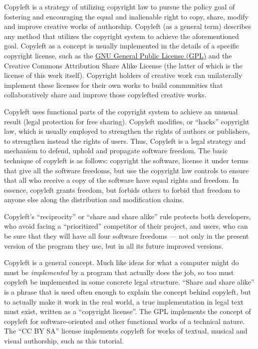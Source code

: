 \label{copyleft-definition}

Copyleft is a strategy of utilizing copyright law to pursue the policy goal
of fostering and encouraging the equal and inalienable right to copy, share,
modify and improve creative works of authorship.  Copyleft (as a general
term) describes any method that utilizes the copyright system to achieve the
aforementioned goal.  Copyleft as a concept is usually implemented in the
details of a specific copyright license, such as the
\hyperref[GPLv3-full-text]{GNU General Public License (GPL)} and the Creative
Commons Attribution Share Alike License (the latter of which is the license
of this work itself).  Copyright holders of creative work can unilaterally
implement these licenses for their own works to build communities that
collaboratively share and improve those copylefted creative works.

Copyleft uses functional parts of the copyright system to achieve an unusual
result (legal protection for free sharing). Copyleft modifies, or ``hacks''
copyright law, which is usually employed to strengthen the rights of authors
or publishers, to strengthen instead the rights of users.  Thus, Copyleft is
a legal strategy and mechanism to defend, uphold and propagate software
freedom. The basic technique of copyleft is as follows: copyright the
software, license it under terms that give all the software freedoms, but use
the copyright law controls to ensure that all who receive a copy of the
software have equal rights and freedom. In essence, copyleft grants freedom,
but forbids others to forbid that freedom to anyone else along the
distribution and modification chains.

Copyleft's ``reciprocity'' or ``share and share alike'' rule protects both
developers, who avoid facing a ``prioritized'' competitor of their project,
and users, who can be sure that they will have all four software freedoms ---
not only in the present version of the program they use, but in all its
future improved versions.

Copyleft is a general concept. Much like ideas for what a computer might
do must be \emph{implemented} by a program that actually does the job, so
too must copyleft be implemented in some concrete legal structure.
``Share and share alike'' is a phrase that is used often enough to explain the
concept behind copyleft, but to actually make it work in the real world, a
true implementation in legal text must exist, written as a ``copyright
license''.  The GPL implements the concept of copyleft for software-oriented
and other functional works of a technical nature.  The ``CC BY SA'' license
implements copyleft for works of textual, musical and visual authorship, such
as this tutorial.

